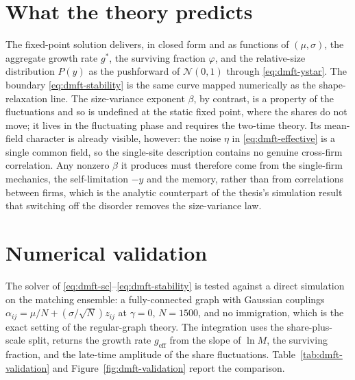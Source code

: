 \section{What the theory predicts}
\label{sec:dmft-observables}

The fixed-point solution delivers, in closed form and as functions of $(\mu,\sigma)$, the
aggregate growth rate $g^\ast$, the surviving fraction $\varphi$, and the relative-size
distribution $P(y)$ as the pushforward of $\mathcal N(0,1)$ through \eqref{eq:dmft-ystar}.
The boundary \eqref{eq:dmft-stability} is the same curve mapped numerically as the
shape-relaxation line. The size-variance exponent $\beta$, by contrast, is a property of
the fluctuations and so is undefined at the static fixed point, where the shares do not
move; it lives in the fluctuating phase and requires the two-time theory. Its mean-field
character is already visible, however: the noise $\eta$ in \eqref{eq:dmft-effective} is a
single common field, so the single-site description contains no genuine cross-firm
correlation. Any nonzero $\beta$ it produces must therefore come from the single-firm
mechanics, the self-limitation $-y$ and the memory, rather than from correlations between
firms, which is the analytic counterpart of the thesis's simulation result that switching off
the disorder removes the size-variance law.

\section{Numerical validation}
\label{sec:dmft-validation}

The solver of \eqref{eq:dmft-sc}--\eqref{eq:dmft-stability} is tested against a direct
simulation on the matching ensemble: a fully-connected graph with Gaussian couplings
$\alpha_{ij} = \mu/N + (\sigma/\sqrt N) z_{ij}$ at $\gamma = 0$, $N = 1500$, and no
immigration, which is the exact setting of the regular-graph theory. The integration uses
the share-plus-scale split, returns the growth rate $g_{\mathrm{eff}}$ from the slope of
$\ln M$, the surviving fraction, and the late-time amplitude of the share fluctuations.
Table~\ref{tab:dmft-validation} and Figure~\ref{fig:dmft-validation} report the comparison.

